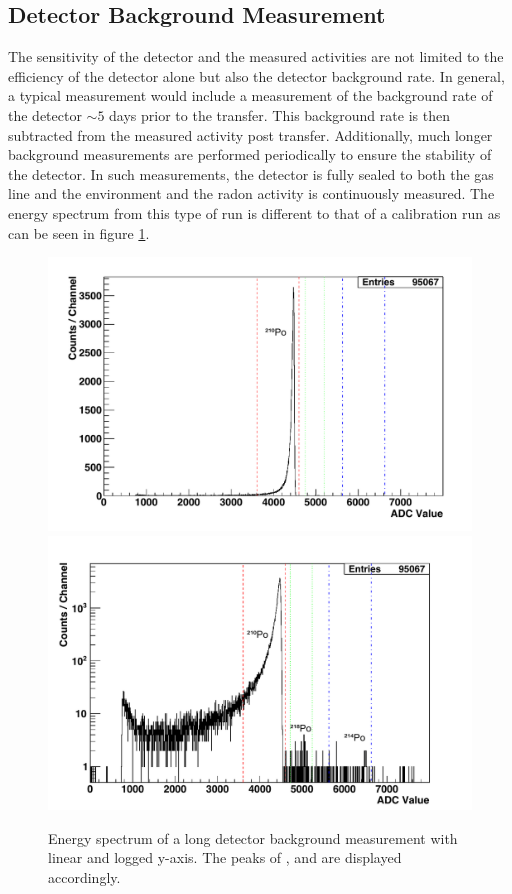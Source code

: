 \subsection{Detector Background Measurement}
\label{secsec:concentration_line}

The sensitivity of the detector and the measured activities are not limited to the efficiency of the detector alone but also the detector background rate. In general, a typical measurement would include a measurement of the background rate of the detector $\sim5$ days prior to the transfer. This background rate is then subtracted from the measured activity post transfer. Additionally, much longer background measurements are performed periodically to ensure the stability of the detector. In such measurements, the detector is fully sealed to both the gas line and the environment and the radon activity is continuously measured. The energy spectrum from this type of run is different to that of a calibration run as can be seen in figure \ref{fig:detector_background_spectrum}.
%
\begin{figure}[b!]
    \centering
    \includegraphics[scale=0.43]{Chapter_4/Figures/det_background/Spectrum_det_background.pdf}
    \includegraphics[scale=0.43]{Chapter_4/Figures/det_background/LogSpectrum_det_background.pdf}
    \caption[Energy spectrum of a long radon emanation detector backgrounds showing the peaks of \PoTOZ{}, \PoTOE{} and \PoTOF{}.]
    {Energy spectrum of a long detector background measurement with linear and logged y-axis. The peaks of \PoTOZ{}, \PoTOE{} and \PoTOF{} are displayed accordingly.}
    \label{fig:detector_background_spectrum}
\end{figure}
%

